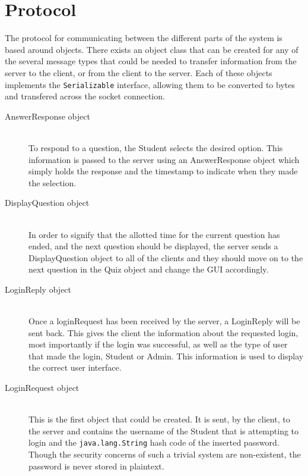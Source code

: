 \section{Protocol}
\label{sec:protocol}

The protocol for communicating between the different parts of the system is
based around objects. There exists an object class that can be created for any
of the several message types that could be needed to transfer information from
the server to the client, or from the client to the server. Each of these
objects implements the \texttt{Serializable} interface, allowing them to be
converted to bytes and transfered across the socket connection.

\begin{description}
	\item[AnswerResponse object] \hfill \\ To respond to a question, the
		Student selects the desired option. This information is passed to the
		server using an AnswerResponse object which simply holds the response
		and the timestamp to indicate when they made the selection.

	\item[DisplayQuestion object]\hfill \\ In order to signify that the
		allotted time for the current question has ended, and the next question
		should be displayed, the server sends a DisplayQuestion object to all
		of the clients and they should move on to the next question in the Quiz
		object and change the GUI accordingly.

	\item[LoginReply object]\hfill \\ Once a loginRequest has been received by
		the server, a LoginReply will be sent back. This gives the client the
		information about the requested login, most importantly if the login
		was successful, as well as the type of user that made the login,
		Student or Admin. This information is used to display the correct user
		interface.

	\item[LoginRequest object]\hfill \\ This is the first object that could be
		created.  It is sent, by the client, to the server and contains the
		username of the Student that is attempting to login and the
		\texttt{java.lang.String} hash code of the inserted password. Though
		the security concerns of such a trivial system are non-existent, the
		password is never stored in plaintext.


\end{description}
